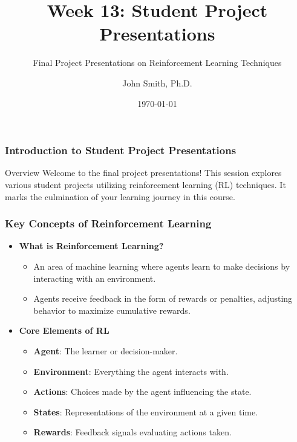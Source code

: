 \documentclass[aspectratio=169]{beamer}
\title[Week 13: Student Project Presentations]{Week 13: Student Project Presentations}
\subtitle{Final Project Presentations on Reinforcement Learning Techniques}
\author[J. Smith]{John Smith, Ph.D.}
\institute[University Name]{
  Department of Computer Science\\
  University Name\\
  \vspace{0.3cm}
  Email: email@university.edu\\
  Website: www.university.edu
}
\date{\today}
\begin{document}
\frame{\titlepage}

\begin{frame}[fragile]
    \frametitle{Introduction to Student Project Presentations}
    \begin{block}{Overview}
        Welcome to the final project presentations! 
        This session explores various student projects utilizing reinforcement learning (RL) techniques. 
        It marks the culmination of your learning journey in this course.
    \end{block}
\end{frame}

\begin{frame}[fragile]
    \frametitle{Key Concepts of Reinforcement Learning}
    \begin{itemize}
        \item \textbf{What is Reinforcement Learning?}
        \begin{itemize}
            \item An area of machine learning where agents learn to make decisions by interacting with an environment.
            \item Agents receive feedback in the form of rewards or penalties, adjusting behavior to maximize cumulative rewards.
        \end{itemize}
        \item \textbf{Core Elements of RL}
        \begin{itemize}
            \item \textbf{Agent}: The learner or decision-maker.
            \item \textbf{Environment}: Everything the agent interacts with.
            \item \textbf{Actions}: Choices made by the agent influencing the state.
            \item \textbf{States}: Representations of the environment at a given time.
            \item \textbf{Rewards}: Feedback signals evaluating actions taken.
        \end{itemize}
    \end{itemize}
\end{frame}
\end{document}
